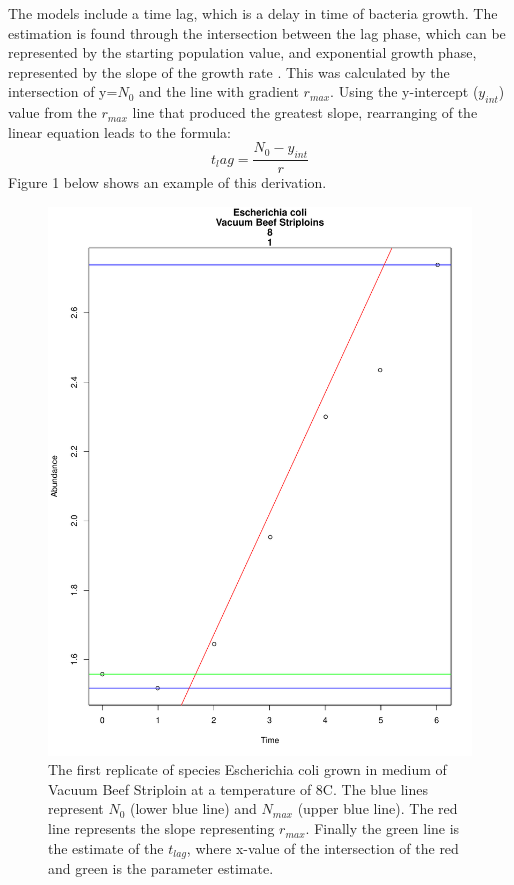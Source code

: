 The models include a time lag, which is a delay in time of bacteria growth. The estimation is found through the intersection between the lag phase, which can be represented by the starting population value, and exponential growth phase, represented by the slope of the growth rate \cite{peleg2011microbial}. This was calculated by the intersection of y=$N_0$ and the line with gradient $r_{max}$. Using the y-intercept ($y_{int}$) value from the $r_{max}$ line that produced the greatest slope, rearranging of the linear equation leads to the formula:
\begin{equation*}
   t_lag=\frac{N_0 - y_{int}}{r}
\end{equation*}
Figure 1 below shows an example of this derivation.
\begin{figure}[h]
\centering
\includegraphics[scale=0.5]{../Results/Parameters_Ecoli.pdf}
\caption{The first replicate of species Escherichia coli grown in medium of Vacuum Beef Striploin at a temperature of 8\degree C. The blue lines represent $N_0$ (lower blue line) and $N_{max}$ (upper blue line). The red line represents the slope representing $r_{max}$. Finally the green line is the estimate of the $t_{lag}$, where x-value of the intersection of the red and green is the parameter estimate.}
\label{fig:Starting parameters}
\end{figure}

